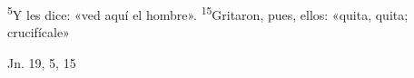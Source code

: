 \documentclass[../../rosario.tex]{subfiles}
\begin{document}
    \textsuperscript{5}Y les dice: «ved aquí el hombre». \textsuperscript{15}Gritaron, pues, ellos: «quita, quita; crucifícale»
    \begin{flushright}
    Jn. 19, 5, 15
    \end{flushright}
\end{document}
